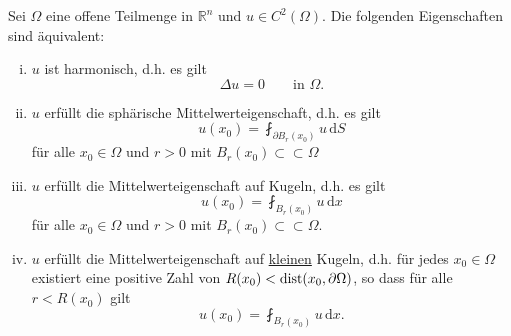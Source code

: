 \begin{satz}
	Sei $\Omega$ eine offene Teilmenge in $\mathbb{R}^n$ und $u \in C^2(\Omega)$. Die folgenden Eigenschaften sind äquivalent:
	\begin{enumerate}[(i)]
		\item $u$ ist harmonisch, d.h. es gilt 
		\begin{equation}
			\Delta u = 0 \qquad \text{in } \Omega.
		\end{equation}
		\item $u$ erfüllt die sphärische Mittelwerteigenschaft, d.h. es gilt
		\begin{equation}
			u(x_0) = \fint_{\partial B_r(x_0)}^{}u \,\mathrm{d}S
		\end{equation}
		für alle $x_0 \in \Omega$ und $r>0$ mit $B_r(x_0) \subset \subset \Omega$
		\item $u$ erfüllt die Mittelwerteigenschaft auf Kugeln, d.h. es gilt
		\begin{equation}
			u(x_0) = \fint_{B_r(x_0)}^{}u \,\mathrm{d}x
		\end{equation}
		für alle $x_0 \in \Omega$ und $r > 0$ mit $B_r(x_0) \subset \subset \Omega$.
		\item $u$ erfüllt die Mittelwerteigenschaft auf \underline{kleinen} Kugeln, d.h. für jedes $x_0 \in \Omega$ existiert eine positive Zahl von $R(x_0) < \operatorname{dist}(x_0,\partial \Omega)$, so dass für alle $r < R(x_0)$ gilt
		\begin{equation}
			u(x_0) = \fint_{B_r(x_0)}^{}u \,\mathrm{d}x.
		\end{equation}
	\end{enumerate}
\end{satz}
